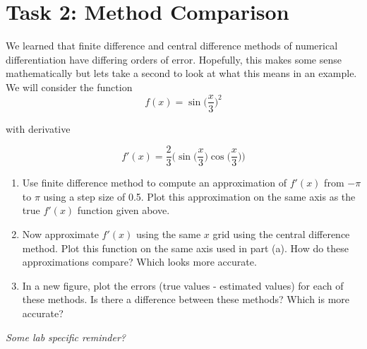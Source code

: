 \documentclass[11pt]{article}
\begin{document}
	\section*{Task 2: Method Comparison}
	\noindent We learned that finite difference and central difference methods of numerical differentiation have differing orders of error. Hopefully, this makes some sense mathematically but lets take a second to look at what this means in an example. We will consider the function \\
	\begin{equation*}
		f(x) = \sin\Big(\frac{x}{3}\Big)^2
	\end{equation*}
	\begin{center}
		with derivative
	\end{center}	
	\begin{equation*}
		f'(x) = \frac{2}{3}\bigg(\sin\Big(\frac{x}{3}\Big)\cos\Big(\frac{x}{3}\Big)\bigg)
	\end{equation*}
	\begin{enumerate}[label=\alph*)]
		\item Use finite difference method to compute an approximation of $f'(x)$ from $-\pi$ to $\pi$ using a step size of 0.5. Plot this approximation on the same axis as the true $f'(x)$ function given above.
		\item Now approximate $f'(x)$ using the same $x$ grid using the central difference method. Plot this function on the same axis used in part (a). How do these approximations compare? Which looks more accurate. 
		\item In a new figure, plot the errors (true values - estimated values) for each of these methods. Is there a difference between these methods? Which is more accurate? 
	\end{enumerate}

	\begin{center}
		\vfill
		\textit{Some lab specific reminder?}
	\end{center}
\end{document}
